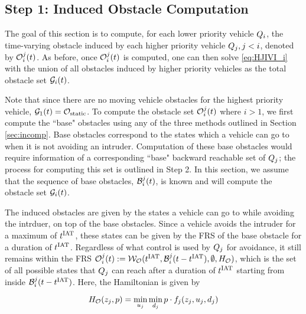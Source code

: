 \subsection{Step 1: Induced Obstacle Computation}
The goal of this section is to compute, for each lower priority vehicle $Q_{i}$, the time-varying obstacle induced by each higher priority vehicle $Q_{j}, j < i$, denoted by $\mathcal{O}_i^j(t)$. As before, once $\mathcal{O}_i^j(t)$ is computed, one can then solve \eqref{eq:HJIVI_i} with the union of all obstacles induced by higher priority vehicles as the total obstacle set $\mathcal{G}_i(t)$. 

Note that since there are no moving vehicle obstacles for the highest priority vehicle, $\mathcal{G}_1(t) = \mathcal{O}_\text{static}$. To compute the obstacle set $\mathcal{O}_i^j(t)$ where $i> 1$, we first compute the ``base" obstacles using any of the three methods outlined in Section \ref{sec:incomp}. Base obstacles correspond to the states which a vehicle can go to when it is not avoiding an intruder. Computation of these base obstacles would require information of a corresponding ``base" backward reachable set of $Q_{j}$; the process for computing this set is outlined in Step 2. In this section, we assume that the sequence of base obstacles, $\mathcal{B}_i^j(t)$, is known and will compute the obstacle set $\mathcal{G}_i(t)$. 

The induced obstacles are given by the states a vehicle can go to while avoiding the intrduer, on top of the base obstacles. Since a vehicle avoids the intruder for a maximum of 
$t^\text{IAT}$, these states can be given by the FRS of the base obstacle for a duration of $t^\text{IAT}$. Regardless of what control is used by $Q_{j}$ for avoidance, it still remains within the FRS $\mathcal{O}_i^j(t) := \mathcal{W}_{\mathcal{O}}(t^\text{IAT}, \mathcal{B}_i^j(t-t^\text{IAT}), \emptyset, H_{\mathcal{O}})$, which is the set of all possible states that $Q_{j}$ can reach after a duration of $t^\text{IAT}$ starting from inside $\mathcal{B}_i^j(t-t^\text{IAT})$. Here, the Hamiltonian is given by

\begin{equation}
H_{\mathcal{O}}(z_j, p) = \min_{u_j} \min_{d_j} p \cdot f_j (z_j, u_j, d_j)
\end{equation}
